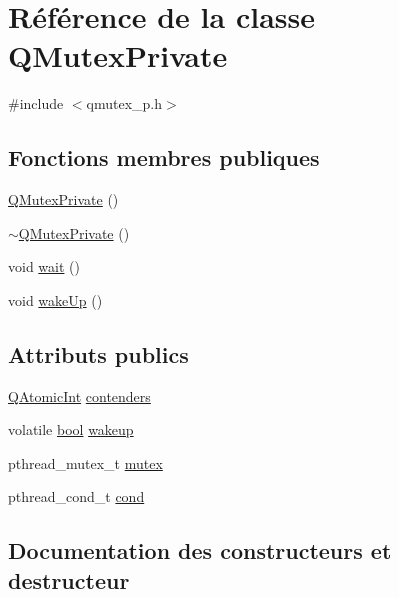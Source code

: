 \hypertarget{class_q_mutex_private}{}\section{Référence de la classe Q\+Mutex\+Private}
\label{class_q_mutex_private}


{\ttfamily \#include $<$qmutex\+\_\+p.\+h$>$}

\subsection*{Fonctions membres publiques}
\begin{DoxyCompactItemize}
\item 
\hyperlink{class_q_mutex_private_aa9c60c53c59f8c6d219516a519e99ef8}{Q\+Mutex\+Private} ()
\item 
\hyperlink{class_q_mutex_private_aed6b0e74b2755a17bb5ac7792717b427}{$\sim$\+Q\+Mutex\+Private} ()
\item 
void \hyperlink{class_q_mutex_private_a28563c090da051f5162ef1a109b2a07b}{wait} ()
\item 
void \hyperlink{class_q_mutex_private_ae3a1d392a534d8bd323428b1b0e80b8f}{wake\+Up} ()
\end{DoxyCompactItemize}
\subsection*{Attributs publics}
\begin{DoxyCompactItemize}
\item 
\hyperlink{class_q_atomic_int}{Q\+Atomic\+Int} \hyperlink{class_q_mutex_private_a4ac3e54a95eed7cc3b0f9a1bc80e34f1}{contenders}
\item 
volatile \hyperlink{qglobal_8h_a1062901a7428fdd9c7f180f5e01ea056}{bool} \hyperlink{class_q_mutex_private_acae53ac5787f6fe69be1321d069f5f7d}{wakeup}
\item 
pthread\+\_\+mutex\+\_\+t \hyperlink{class_q_mutex_private_acd3490bc71fdb04de75a7055b1211def}{mutex}
\item 
pthread\+\_\+cond\+\_\+t \hyperlink{class_q_mutex_private_a58da8d570849a70617e6f87d2945f639}{cond}
\end{DoxyCompactItemize}


\subsection{Documentation des constructeurs et destructeur}
\hypertarget{class_q_mutex_private_aa9c60c53c59f8c6d219516a519e99ef8}{}
